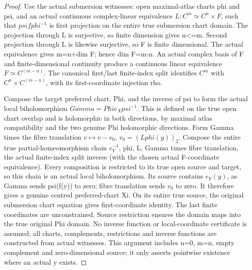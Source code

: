 \begin{proof}
Use the actual submersion witnesses: open maximal-atlas charts phi and psi,
and an actual continuous complex-linear equivalence
$L:C^m\simeq C^n\times F$, such that $psi f phi^{-1}$ is first projection on the
entire true submersion chart domain. The projection through L is surjective,
so finite dimension gives n<=m. Second projection through L is likewise
surjective, so F is finite dimensional. The actual equivalence gives
m=n+dim F; hence dim F=m-n. An actual complex basis of F and finite-dimensional
continuity produce a continuous linear equivalence $F\simeq C^{(m-n)}$.
The canonical first/last finite-index split identifies $C^m$ with
$C^n\times C^{(m-n)}$, with its first-coordinate injection rho.

Compose the target preferred chart, Phi, and the inverse of psi to form the
actual local biholomorphism $Gamma=Phi e_X psi^{-1}$. This is defined on the
true open chart overlap and is holomorphic in both directions, by maximal
atlas compatibility and the two genuine Phi holomorphic directions. Form
Gamma times the fibre translation $v\mapsto v-v_0$, $v_0=(L phi(y))_2$.
Compose the entire true partial-homeomorphism chain
 $e_Y^{-1}$, phi, L, Gamma times fibre translation, the actual finite-index
split inverse (with the chosen actual F-coordinate equivalence).
Every composition is restricted to its true open source and target, so
this chain is an actual local biholomorphism. Its source contains $e_Y(y)$,
as Gamma sends psi(f(y)) to zero; fibre translation sends $v_0$ to zero.
It therefore gives a genuine centred preferred-chart Xi. On its entire
true source, the original submersion chart equation gives first-coordinate
identity. The last finite coordinates are unconstrained. Source restriction
ensures the domain maps into the true original Phi domain. No inverse
function or local-coordinate certificate is assumed; all charts, complements,
restrictions and inverse functions are constructed from actual witnesses.
This argument includes n=0, m=n, empty complement and zero-dimensional source;
it only asserts pointwise existence where an actual y exists.
\end{proof}

